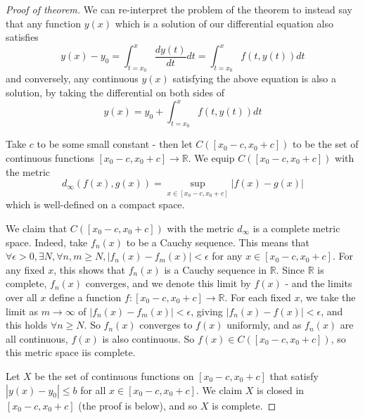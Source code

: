 \documentclass{article}
\theoremstyle{definition}
\theoremstyle{plain}%
\theoremstyle{remark}
\newcommand{\R}{\mathbb{R}}
\begin{document}
\begin{proof}[Proof of theorem]
     We can re-interpret the problem of the theorem to instead say that any function $y(x)$ which is a solution of our differential equation also satisfies
     \[y(x) - y_0 = \int_{t = x_0}^x \frac{dy(t)}{dt}dt = \int_{t=x_0}^x f(t, y(t)) dt\]
     and conversely, any continuous $y(x)$ satisfying the above equation is also a solution, by taking the differential on both sides of
     \[y(x) = y_0 + \int_{t = x_0}^x f(t, y(t)) dt\]
     
     Take $c$ to be some small constant - then let $C([x_0 - c, x_0 + c])$ to be the set of continuous functions $[x_0 - c, x_0 + c] \to \R$. We equip $C([x_0 - c, x_0 + c])$ with the metric
     \[d_\infty(f(x), g(x)) = \sup_{x \in [x_0  - c, x_0 + c]} |f(x) - g(x)|\]
     which is well-defined on a compact space.
     
     We claim that $C([x_0 - c, x_0 + c])$ with the metric $d_\infty$ is a complete metric space. Indeed, take $f_n(x)$ to be a Cauchy sequence. This means that $\forall \epsilon > 0, \exists N, \forall n, m \ge N, |f_n(x) - f_m(x)| < \epsilon$ for any $x \in [x_0 - c, x_0 + c]$. For any fixed $x$, this shows that $f_n(x)$ is a Cauchy sequence in $\R$. Since $\R$ is complete, $f_n(x)$ converges, and we denote this limit by $f(x)$ - and the limits over all $x$ define a function $f : [x_0 - c, x_0 + c] \to \R$. For each fixed $x$, we take the limit as $m \to \infty$ of $|f_n(x) - f_m(x)| < \epsilon$, giving $|f_n(x) - f(x)| < \epsilon$, and this holds $\forall n \ge N$. So $f_n(x)$ converges to $f(x)$ uniformly, and as $f_n(x)$ are all continuous, $f(x)$ is also continuous. So $f(x) \in C([x_0 - c, x_0 + c])$, so this metric space iis complete.
     
     Let $X$ be the set of continuous functions on $[x_0 - c, x_0 + c]$ that satisfy $|y(x) - y_0| \le b$ for all $x \in [x_0 - c, x_0 + c]$. We claim $X$ is closed in $[x_0 - c, x_0 + c]$ (the proof is below), and so $X$ is complete.
     

\end{proof}
\end{document}
